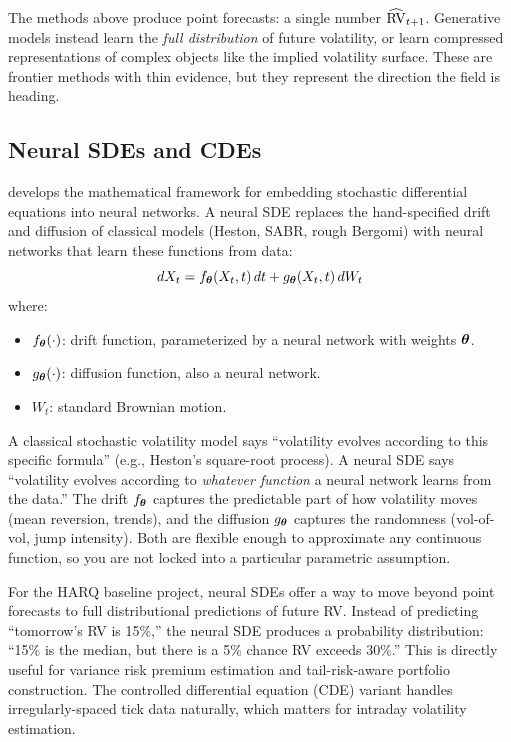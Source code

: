 The methods above produce point forecasts: a single number $\widehat{\operatorname{RV}}_{t+1}$.
Generative models instead learn the \emph{full distribution} of future volatility, or learn compressed representations of complex objects like the implied volatility surface.
These are frontier methods with thin evidence, but they represent the direction the field is heading.

\subsection{Neural SDEs and CDEs}

\citet{Kidger2021NeuralSDE} develops the mathematical framework for embedding stochastic differential equations into neural networks.
A neural SDE replaces the hand-specified drift and diffusion of classical models (Heston, SABR, rough Bergomi) with neural networks that learn these functions from data:
\begin{equation}\label{eq:neural-sde}
  dX_t = f_{\bm{\theta}}(X_t, t)\,dt + g_{\bm{\theta}}(X_t, t)\,dW_t
\end{equation}
where:
\begin{itemize}[nosep]
  \item $f_{\bm{\theta}}(\cdot)$: drift function, parameterized by a neural network with weights $\bm{\theta}$.
  \item $g_{\bm{\theta}}(\cdot)$: diffusion function, also a neural network.
  \item $W_t$: standard Brownian motion.
\end{itemize}

\begin{intuition}
A classical stochastic volatility model says ``volatility evolves according to this specific formula'' (e.g., Heston's square-root process).
A neural SDE says ``volatility evolves according to \emph{whatever function} a neural network learns from the data.''
The drift $f_{\bm{\theta}}$ captures the predictable part of how volatility moves (mean reversion, trends), and the diffusion $g_{\bm{\theta}}$ captures the randomness (vol-of-vol, jump intensity).
Both are flexible enough to approximate any continuous function, so you are not locked into a particular parametric assumption.
\end{intuition}

\begin{projectconnection}
For the HARQ baseline project, neural SDEs offer a way to move beyond point forecasts to full distributional predictions of future RV.
Instead of predicting ``tomorrow's RV is 15\%,'' the neural SDE produces a probability distribution: ``15\% is the median, but there is a 5\% chance RV exceeds 30\%.''
This is directly useful for variance risk premium estimation and tail-risk-aware portfolio construction.
The controlled differential equation (CDE) variant handles irregularly-spaced tick data naturally, which matters for intraday volatility estimation.
\end{projectconnection}

